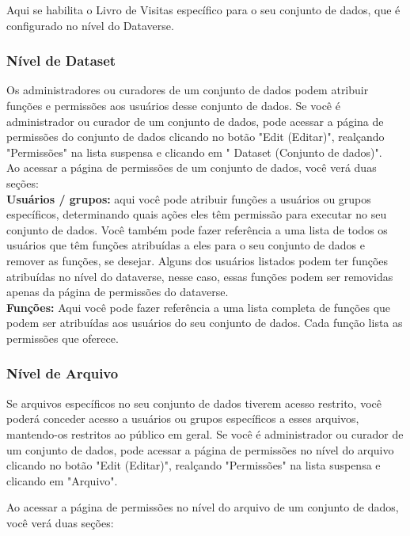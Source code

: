 \documentclass[12pt,hidelinks]{article}
\begin{document}
\qquad Aqui se habilita o Livro de Visitas específico para o seu conjunto de dados, que é configurado no nível do Dataverse.

        \subsubsection{Nível de Dataset}
        
\qquad Os administradores ou curadores de um conjunto de dados podem atribuir funções e permissões aos usuários desse conjunto de dados. Se você é administrador ou curador de um conjunto de dados, pode acessar a página de permissões do conjunto de dados clicando no botão "Edit (Editar)", realçando "Permissões" na lista suspensa e clicando em " Dataset (Conjunto de dados)".\\

Ao acessar a página de permissões de um conjunto de dados, você verá duas seções:\\

\textbf{Usuários / grupos:} aqui você pode atribuir funções a usuários ou grupos específicos, determinando quais ações eles têm permissão para executar no seu conjunto de dados. Você também pode fazer referência a uma lista de todos os usuários que têm funções atribuídas a eles para o seu conjunto de dados e remover as funções, se desejar. Alguns dos usuários listados podem ter funções atribuídas no nível do dataverse, nesse caso, essas funções podem ser removidas apenas da página de permissões do dataverse.\\

\textbf{Funções:} Aqui você pode fazer referência a uma lista completa de funções que podem ser atribuídas aos usuários do seu conjunto de dados. Cada função lista as permissões que oferece.
        
        \subsubsection{Nível de Arquivo}
        
\qquad Se arquivos específicos no seu conjunto de dados tiverem acesso restrito, você poderá conceder acesso a usuários ou grupos específicos a esses arquivos, mantendo-os restritos ao público em geral. Se você é administrador ou curador de um conjunto de dados, pode acessar a página de permissões no nível do arquivo clicando no botão "Edit (Editar)", realçando "Permissões" na lista suspensa e clicando em "Arquivo".

Ao acessar a página de permissões no nível do arquivo de um conjunto de dados, você verá duas seções:\\
\end{document}
